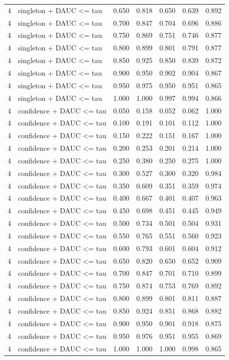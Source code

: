 \begin{tabular}{rlrrrrr}
4 & singleton + DAUC <= tau & 0.650 & 0.818 & 0.650 & 0.639 & 0.892 \\
4 & singleton + DAUC <= tau & 0.700 & 0.847 & 0.704 & 0.696 & 0.886 \\
4 & singleton + DAUC <= tau & 0.750 & 0.869 & 0.751 & 0.746 & 0.877 \\
4 & singleton + DAUC <= tau & 0.800 & 0.899 & 0.801 & 0.791 & 0.877 \\
4 & singleton + DAUC <= tau & 0.850 & 0.925 & 0.850 & 0.839 & 0.872 \\
4 & singleton + DAUC <= tau & 0.900 & 0.950 & 0.902 & 0.904 & 0.867 \\
4 & singleton + DAUC <= tau & 0.950 & 0.975 & 0.950 & 0.951 & 0.865 \\
4 & singleton + DAUC <= tau & 1.000 & 1.000 & 0.997 & 0.994 & 0.866 \\
4 & confidence + DAUC <= tau & 0.050 & 0.158 & 0.052 & 0.062 & 1.000 \\
4 & confidence + DAUC <= tau & 0.100 & 0.191 & 0.101 & 0.112 & 1.000 \\
4 & confidence + DAUC <= tau & 0.150 & 0.222 & 0.151 & 0.167 & 1.000 \\
4 & confidence + DAUC <= tau & 0.200 & 0.253 & 0.201 & 0.214 & 1.000 \\
4 & confidence + DAUC <= tau & 0.250 & 0.380 & 0.250 & 0.275 & 1.000 \\
4 & confidence + DAUC <= tau & 0.300 & 0.527 & 0.300 & 0.320 & 0.984 \\
4 & confidence + DAUC <= tau & 0.350 & 0.609 & 0.351 & 0.359 & 0.974 \\
4 & confidence + DAUC <= tau & 0.400 & 0.667 & 0.401 & 0.407 & 0.963 \\
4 & confidence + DAUC <= tau & 0.450 & 0.698 & 0.451 & 0.445 & 0.949 \\
4 & confidence + DAUC <= tau & 0.500 & 0.734 & 0.501 & 0.504 & 0.931 \\
4 & confidence + DAUC <= tau & 0.550 & 0.765 & 0.551 & 0.560 & 0.923 \\
4 & confidence + DAUC <= tau & 0.600 & 0.793 & 0.601 & 0.604 & 0.912 \\
4 & confidence + DAUC <= tau & 0.650 & 0.820 & 0.650 & 0.652 & 0.909 \\
4 & confidence + DAUC <= tau & 0.700 & 0.847 & 0.701 & 0.710 & 0.899 \\
4 & confidence + DAUC <= tau & 0.750 & 0.874 & 0.753 & 0.769 & 0.892 \\
4 & confidence + DAUC <= tau & 0.800 & 0.899 & 0.801 & 0.811 & 0.887 \\
4 & confidence + DAUC <= tau & 0.850 & 0.924 & 0.851 & 0.868 & 0.882 \\
4 & confidence + DAUC <= tau & 0.900 & 0.950 & 0.901 & 0.918 & 0.875 \\
4 & confidence + DAUC <= tau & 0.950 & 0.976 & 0.951 & 0.955 & 0.869 \\
4 & confidence + DAUC <= tau & 1.000 & 1.000 & 1.000 & 0.998 & 0.865 \\
\bottomrule
\end{tabular}
